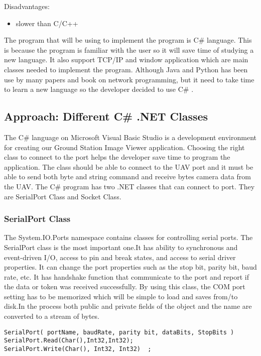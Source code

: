 Disadvantages:
\begin{itemize}
\item slower than C/C++
\end{itemize}

The program that will be using to implement the program is C\# language. 
This is because the program is familiar with the user so it will save time of studying a new language.
It also support TCP/IP and window application which are main classes needed to implement the program.
Although Java and Python has been use by many papers and book on network programming, but it need to take time to learn a new language so the developer decided to use C\# \cite{normanM,guidoR,kennethC,elliotH}.



\subsection{Approach: Different C\# .NET Classes}
The C\# language on Microsoft Visual Basic Studio is a development environment for creating our Ground Station Image Viewer application. Choosing the right class to connect to the port helps the developer save time to program the application. The class should be able to connect to the UAV port and it must be able to send both byte and string command and receive bytes camera data from the UAV.  The C\# program has two .NET classes that can connect to port. They are SerialPort Class and Socket Class.
 
\subsubsection{SerialPort Class}
The System.IO.Ports namespace contains classes for controlling serial ports. The SerialPort class is the most important one.It has ability to synchronous and event-driven I/O, access to pin and break states, and access to serial driver properties\cite{peak_netFrame}. It can change the port properties such as the stop bit, parity bit, baud rate, etc. It has handshake function that communicate to the port and report if the data or token was received successfully.
By using this class, the COM port setting has to be memorized which will be simple to load and saves from/to disk.In the process both public and private fields of the object and the name are converted to a stream of bytes.

\begin{lstlisting}[caption=Serial Port class connection\, read and write method, label=serialPortconn]
SerialPort( portName, baudRate, parity bit, dataBits, StopBits ) 
SerialPort.Read(Char(),Int32,Int32);
SerialPort.Write(Char(), Int32, Int32)	;
\end{lstlisting}

